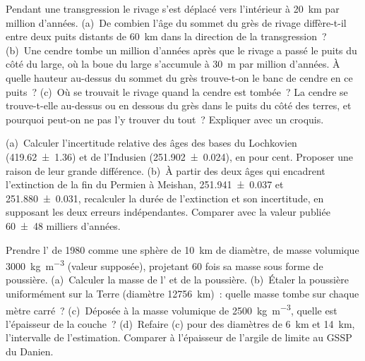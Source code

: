 \begin{exercise}[$\star\star$]\label{exo:b1:stratigraphic-scale:6}
Pendant une transgression le rivage s'est déplacé vers l'intérieur à \qty{20}{km} par million
d'années. (a)~De combien l'âge du sommet du grès de rivage diffère-t-il
entre deux puits distants de \qty{60}{km} dans la direction de la transgression~?
(b)~Une cendre tombe un million d'années après que le rivage a passé le puits du côté du large,
où la boue du large s'accumule à \qty{30}{m} par million d'années. À quelle hauteur
au-dessus du sommet du grès trouve-t-on le banc de cendre en ce puits~? (c)~Où se trouvait le
rivage quand la cendre est tombée~? La cendre se trouve-t-elle au-dessus ou en dessous du grès dans
le puits du côté des terres, et pourquoi peut-on ne pas l'y trouver du tout~? Expliquer avec un
croquis.
\end{exercise}

\begin{exercise}[$\star\star$]\label{exo:b1:stratigraphic-scale:7}
(a)~Calculer l'incertitude relative des âges des bases du Lochkovien
(\qty[uncertainty-mode=separate]{419.62(136)}{\Ma}) et de l'Indusien (\qty[uncertainty-mode=separate]{251.902(24)}{\Ma}), en pour
cent. Proposer une raison de leur grande différence. (b)~À partir des deux âges qui encadrent
l'extinction de la fin du Permien à Meishan, \qty[uncertainty-mode=separate]{251.941(37)}{\Ma} et
\qty[uncertainty-mode=separate]{251.880(31)}{\Ma}, recalculer la durée de l'extinction et son
incertitude, en supposant les deux erreurs indépendantes. Comparer avec la valeur
publiée \num[uncertainty-mode=separate]{60 \pm 48} milliers d'années.
\end{exercise}

\begin{exercise}[$\star\star$]\label{exo:b1:stratigraphic-scale:8}
Prendre l' de 1980 comme une sphère de \qty{10}{km} de diamètre, de masse volumique
\qty{3000}{kg.m^{-3}} (valeur supposée), projetant 60 fois sa masse sous forme de poussière.
(a)~Calculer la masse de l' et de la poussière. (b)~Étaler la poussière uniformément
sur la Terre (diamètre \qty{12756}{km})~: quelle masse tombe sur chaque mètre carré~?
(c)~Déposée à la masse volumique de \qty{2500}{kg.m^{-3}}, quelle est l'épaisseur de la couche~?
(d)~Refaire (c) pour des diamètres de \qty{6}{km} et \qty{14}{km}, l'intervalle de
l'estimation. Comparer à l'épaisseur de l'argile de limite au GSSP du Danien.
\end{exercise}

